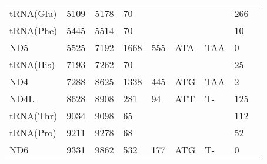 \documentclass[../DISSERTACAO_MAIN.tex]{subfiles}
\begin{document}
\begin{longtable}{llllllllllllllllllllll}
			tRNA(Glu)    & \multicolumn{2}{l}{5109}    & \multicolumn{2}{l}{5178}    & \multicolumn{2}{l}{70}          & \multicolumn{3}{l}{}                          & \multicolumn{3}{l}{}      & \multicolumn{3}{l}{}        & \multicolumn{3}{l}{266}         & \multicolumn{3}{l}{}         \\
			tRNA(Phe)    & \multicolumn{2}{l}{5445}    & \multicolumn{2}{l}{5514}    & \multicolumn{2}{l}{70}          & \multicolumn{3}{l}{}                          & \multicolumn{3}{l}{}      & \multicolumn{3}{l}{}        & \multicolumn{3}{l}{10}          & \multicolumn{3}{l}{}         \\
			ND5          & \multicolumn{2}{l}{5525}    & \multicolumn{2}{l}{7192}    & \multicolumn{2}{l}{1668}        & \multicolumn{3}{l}{555}                       & \multicolumn{3}{l}{ATA}   & \multicolumn{3}{l}{TAA}     & \multicolumn{3}{l}{0}           & \multicolumn{3}{l}{}         \\
			tRNA(His)    & \multicolumn{2}{l}{7193}    & \multicolumn{2}{l}{7262}    & \multicolumn{2}{l}{70}          & \multicolumn{3}{l}{}                          & \multicolumn{3}{l}{}      & \multicolumn{3}{l}{}        & \multicolumn{3}{l}{25}          & \multicolumn{3}{l}{}         \\
			ND4          & \multicolumn{2}{l}{7288}    & \multicolumn{2}{l}{8625}    & \multicolumn{2}{l}{1338}        & \multicolumn{3}{l}{445}                       & \multicolumn{3}{l}{ATG}   & \multicolumn{3}{l}{TAA}     & \multicolumn{3}{l}{2}           & \multicolumn{3}{l}{}         \\
			ND4L         & \multicolumn{2}{l}{8628}    & \multicolumn{2}{l}{8908}    & \multicolumn{2}{l}{281}         & \multicolumn{3}{l}{94}                        & \multicolumn{3}{l}{ATT}   & \multicolumn{3}{l}{T-}      & \multicolumn{3}{l}{125}         & \multicolumn{3}{l}{}         \\
			tRNA(Thr)    & \multicolumn{2}{l}{9034}    & \multicolumn{2}{l}{9098}    & \multicolumn{2}{l}{65}          & \multicolumn{3}{l}{}                          & \multicolumn{3}{l}{}      & \multicolumn{3}{l}{}        & \multicolumn{3}{l}{112}         & \multicolumn{3}{l}{}         \\
			tRNA(Pro)    & \multicolumn{2}{l}{9211}    & \multicolumn{2}{l}{9278}    & \multicolumn{2}{l}{68}          & \multicolumn{3}{l}{}                          & \multicolumn{3}{l}{}      & \multicolumn{3}{l}{}        & \multicolumn{3}{l}{52}          & \multicolumn{3}{l}{}         \\
			ND6          & \multicolumn{2}{l}{9331}    & \multicolumn{2}{l}{9862}    & \multicolumn{2}{l}{532}         & \multicolumn{3}{l}{177}                       & \multicolumn{3}{l}{ATG}   & \multicolumn{3}{l}{T-}      & \multicolumn{3}{l}{0}           & \multicolumn{3}{l}{}         \\

\end{longtable}
\end{document}
